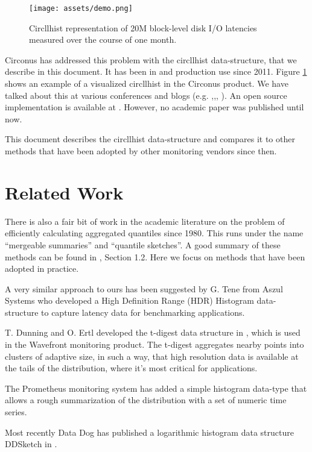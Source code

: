 \documentclass{article}
\theoremstyle{plain}
\theoremstyle{remark}
\begin{document}
\begin{figure}
  \texttt{[image: assets/demo.png]}
  \caption{Circllhist representation of 20M block-level disk I/O latencies measured over the course
    of one month.}
  \label{fig:demo}
\end{figure}

Circonus has addressed this problem with the circllhist data-structure, that we describe in this document.
It has been in and production use since 2011.
Figure \ref{fig:demo} shows an example of a visualized circllhist in the Circonus product.
We have talked about this at various conferences and blogs (e.g. \cite{TS0},\cite{TS1},\cite{TS2}, \cite{HH1}).
An open source implementation is available at \cite{libcircllhist}.
However, no academic paper was published until now.

This document describes the circllhist data-structure and compares it to other methods
that have been adopted by other monitoring vendors since then.

\section{Related Work} \label{sec:rw}

There is also a fair bit of work in the academic literature on the problem of efficiently
calculating aggregated quantiles since 1980. This runs under the name ``mergeable summaries'' and
``quantile sketches''. A good summary of these methods can be found in \cite{dd}, Section 1.2.
Here we focus on methods that have been adopted in practice.

A very similar approach to ours has been suggested by G. Tene from Aszul Systems who developed
a High Definition Range (HDR) Histogram data-structure \cite{hdr} to capture latency
data for benchmarking applications.

T. Dunning and O. Ertl developed the t-digest data structure in \cite{tdigest}, which is used in the
Wavefront monitoring product. The t-digest aggregates
nearby points into clusters of adaptive size, in such a way, that high resolution data is available
at the tails of the distribution, where it's most critical for applications.

The Prometheus monitoring system \cite{prom} has added a simple histogram data-type that allows a
rough summarization of the distribution with a set of numeric time series.

Most recently Data Dog has published a logarithmic histogram data structure DDSketch in \cite{dd}.
\end{document}
